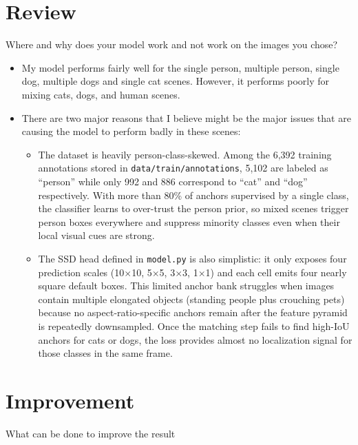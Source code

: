 \documentclass[11pt]{article}
\begin{document}
\FloatBarrier

\section{Review}
\begin{tcolorbox}[colback=white,colframe=black,title=Performance Reflection]
Where and why does your model work and not work on the images you chose?
\end{tcolorbox}

\begin{itemize}
    \item My model performs fairly well for the single person, multiple person, single dog, multiple dogs and single cat scenes. However, it performs poorly for mixing cats, dogs, and human scenes.
    \item There are two major reasons that I believe might be the major issues that are causing the model to perform badly in these scenes:
    \begin{itemize}
        \item The dataset is heavily person-class-skewed. Among the 6{,}392 training annotations stored in \texttt{data/train/annotations}, 5{,}102 are labeled as ``person'' while only 992 and 886 correspond to ``cat'' and ``dog'' respectively. With more than 80\% of anchors supervised by a single class, the classifier learns to over-trust the person prior, so mixed scenes trigger person boxes everywhere and suppress minority classes even when their local visual cues are strong.
        \item The SSD head defined in \texttt{model.py} is also simplistic: it only exposes four prediction scales (10$\times$10, 5$\times$5, 3$\times$3, 1$\times$1) and each cell emits four nearly square default boxes. This limited anchor bank struggles when images contain multiple elongated objects (standing people plus crouching pets) because no aspect-ratio-specific anchors remain after the feature pyramid is repeatedly downsampled. Once the matching step fails to find high-IoU anchors for cats or dogs, the loss provides almost no localization signal for those classes in the same frame.
    \end{itemize}
\end{itemize}

\section{Improvement}
\begin{tcolorbox}[colback=white,colframe=black,title=Improvement]
What can be done to improve the result 
\end{tcolorbox}
\end{document}
